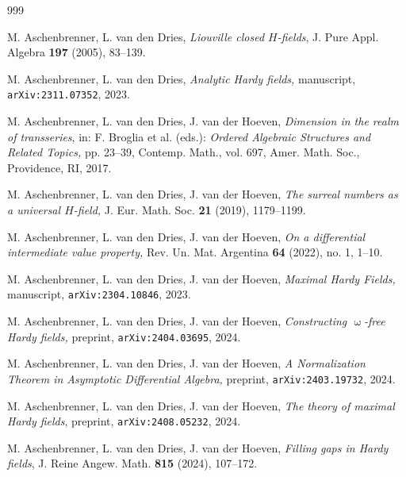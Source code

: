 \documentclass[]{amsart}
\numberwithin{equation}{section}
\theoremstyle{definition}
\theoremstyle{remark}
\def \upo{\upomega}
\begin{document}

\begin{thebibliography}{999}

 M. Aschenbrenner,  L. van den Dries,  {\it Liouville closed $H$-fields}\/, J. Pure  Appl. Algebra {\bf 197} (2005), 83--139.

M. Aschenbrenner,  L. van den Dries,  {\em Analytic Hardy fields,} manuscript, {\tt 		arXiv:2311.07352}, 2023.





M. Aschenbrenner,  L. van den Dries, J. van der Hoeven, {\it Dimension in the realm of trans\-series}\/, 
in:  F. Broglia et al. (eds.): {\it Ordered Algebraic Structures and Related Topics,}\/ pp. 23--39, Contemp. Math., vol. 697,
 Amer. Math. Soc., Providence, RI, 2017.
 

 M. Aschenbrenner, L. van den Dries, J. van der Hoeven, \textit{The surreal numbers as a universal $H$-field,}  J. Eur. Math. Soc. {\bf 21} (2019), 1179--1199.

 M. Aschenbrenner,  L. van den Dries, J. van der Hoeven,  {\em On a differential intermediate value property,} Rev. Un. Mat. Argentina {\bf 64} (2022), no. 1, 1--10.  

M. Aschenbrenner,  L. van den Dries, J. van der Hoeven, {\em Maximal Hardy Fields,} manuscript, {\tt 	arXiv:2304.10846}, 2023.


M. Aschenbrenner,  L. van den Dries, J. van der Hoeven, {\em  Constructing $\upo$-free Hardy fields,} preprint,  {\tt 	arXiv:2404.03695}, 2024.

M. Aschenbrenner,  L. van den Dries, J. van der Hoeven, {\em A Normalization Theorem in Asymptotic Differential Algebra,} preprint, 
 {\tt 	arXiv:2403.19732}, 2024.

 M. Aschenbrenner, L. van den Dries, J. van der Hoeven, 
\textit{The theory of maximal Hardy fields},   preprint, {\tt arXiv:2408.05232}, 2024.  

M. Aschenbrenner,  L. van den Dries, J. van der Hoeven, {\it Filling gaps in Hardy fields}\/,  J. Reine Angew. Math. {\bf 815} (2024), 107--172.  


\end{thebibliography}
\end{document}
